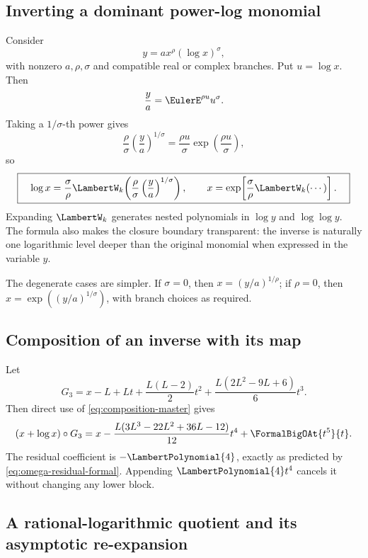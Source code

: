 \documentclass[11pt]{article}
\theoremstyle{pltheorem}
\newcommand{\compose}{\mathbin{\circ}}
\begin{document}
\subsection{Inverting a dominant power-log monomial}

Consider
\begin{equation}\label{eq:powerlog-inversion}
 y=a x^\rho(\log x)^\sigma,
\end{equation}
with nonzero \(a,\rho,\sigma\) and compatible real or complex branches.  Put \(u=\log x\).  Then
\[
 \frac ya=\EulerE^{\rho u}u^\sigma.
\]
Taking a \(1/\sigma\)-th power gives
\[
 \frac{\rho}{\sigma}\left(\frac ya\right)^{1/\sigma}
 =\frac{\rho u}{\sigma}\exp\left(\frac{\rho u}{\sigma}\right),
\]
so
\begin{equation}\label{eq:powerlog-inverse-exact}
 \boxed{\quad
 \log x=\frac{\sigma}{\rho}
 \LambertW_k\!\left(\frac{\rho}{\sigma}
 \left(\frac ya\right)^{1/\sigma}\right),
 \qquad
 x=\exp\!\left[\frac{\sigma}{\rho}\LambertW_k(\cdots)\right].
 \quad}
\end{equation}
Expanding \(\LambertW_k\) generates nested polynomials in \(\log y\) and \(\log\log y\).  The formula also makes the closure boundary transparent: the inverse is naturally one logarithmic level deeper than the original monomial when expressed in the variable \(y\).

The degenerate cases are simpler.  If \(\sigma=0\), then
\(x=(y/a)^{1/\rho}\); if \(\rho=0\), then
\(x=\exp((y/a)^{1/\sigma})\), with branch choices as required.

\subsection{Composition of an inverse with its map}

Let
\begin{equation}\label{eq:omega3}
 G_3=x-L+Lt+\frac{L(L-2)}2t^2
 +\frac{L(2L^2-9L+6)}6t^3.
\end{equation}
Then direct use of \cref{eq:composition-master} gives
\begin{equation}\label{eq:omega3-residual}
 (x+\log x)\compose G_3
 =x-\frac{L(3L^3-22L^2+36L-12)}{12}t^4
 +\FormalBigOAt{t^5}{t}.
\end{equation}
The residual coefficient is \(-\LambertPolynomial{4}\), exactly as predicted by
\cref{eq:omega-residual-formal}.  Appending \(\LambertPolynomial{4}t^4\) cancels it without changing any lower block.

\subsection{A rational-logarithmic quotient and its asymptotic re-expansion}
\end{document}
